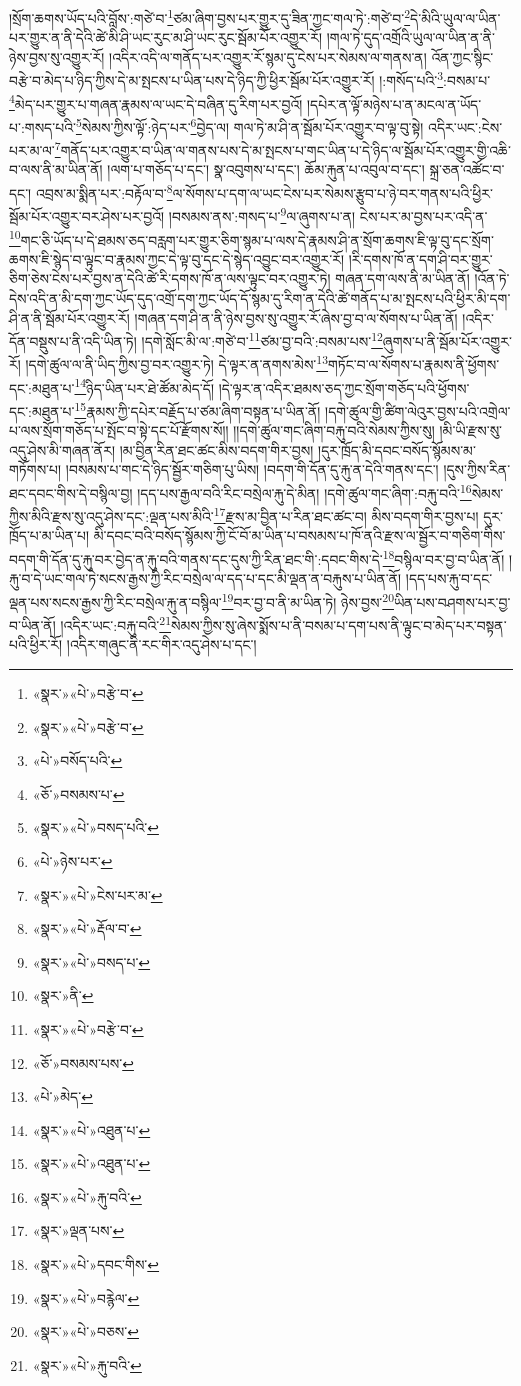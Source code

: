 །སྲོག་ཆགས་ཡོད་པའི་བློས་:གཙེ་བ་\footnote{«སྣར་»«པེ་»བརྩེ་བ་}ཙམ་ཞིག་བྱས་པར་གྱུར་དུ་ཟིན་ཀྱང་གལ་ཏེ་:གཙེ་བ་\footnote{«སྣར་»«པེ་»བརྩེ་བ་}དེ་མིའི་ཡུལ་ལ་ཡིན་པར་གྱུར་ན་ནི་དེའི་ཚེ་མི་ཤི་ཡང་རུང་མ་ཤི་ཡང་རུང་སྦོམ་པོར་འགྱུར་རོ། །གལ་ཏེ་དུད་འགྲོའི་ཡུལ་ལ་ཡིན་ན་ནི་ཉེས་བྱས་སུ་འགྱུར་རོ། །འདིར་འདི་ལ་གནོད་པར་འགྱུར་རོ་སྙམ་དུ་ངེས་པར་སེམས་ལ་གནས་ན། འོན་ཀྱང་སྙིང་བརྩེ་བ་མེད་པ་ཉིད་ཀྱིས་དེ་མ་སྤངས་པ་ཡིན་པས་དེ་ཉིད་ཀྱི་ཕྱིར་སྦོམ་པོར་འགྱུར་རོ། །:གསོད་པའི་\footnote{«པེ་»བསོད་པའི་}:བསམ་པ་\footnote{«ཅོ་»བསམས་པ་}མེད་པར་གྱུར་པ་གཞན་རྣམས་ལ་ཡང་དེ་བཞིན་དུ་རིག་པར་བྱའོ། །དཔེར་ན་ལྟོ་མཉེས་པ་ན་མངལ་ན་ཡོད་པ་:གསད་པའི་\footnote{«སྣར་»«པེ་»བསད་པའི་}སེམས་ཀྱིས་ལྟོ་:ཉེད་པར་\footnote{«པེ་»ཉེས་པར་}བྱེད་ལ། གལ་ཏེ་མ་ཤི་ན་སྦོམ་པོར་འགྱུར་བ་ལྟ་བུ་སྟེ། འདིར་ཡང་:ངེས་པར་མ་ལ་\footnote{«སྣར་»«པེ་»ངེས་པར་མ་}གནོད་པར་འགྱུར་བ་ཡིན་ལ་གནས་པས་དེ་མ་སྤངས་པ་གང་ཡིན་པ་དེ་ཉིད་ལ་སྦོམ་པོར་འགྱུར་གྱི་འཆི་བ་ལས་ནི་མ་ཡིན་ནོ། །ལག་པ་གཅོད་པ་དང་། སྣ་འབུགས་པ་དང་། ཆོམ་རྐུན་པ་འབུལ་བ་དང་། སྐྲ་ཅན་འཚོང་བ་དང་། འབྲས་མ་སྨིན་པར་:བརྟོལ་བ་\footnote{«སྣར་»«པེ་»རྡོལ་བ་}ལ་སོགས་པ་དག་ལ་ཡང་ངེས་པར་སེམས་རྩུབ་པ་ཉེ་བར་གནས་པའི་ཕྱིར་སྦོམ་པོར་འགྱུར་བར་ཤེས་པར་བྱའོ། །བསམས་ནས་:གསད་པ་\footnote{«སྣར་»«པེ་»བསད་པ་}ལ་ཞུགས་པ་ན། ངེས་པར་མ་བྱས་པར་འདི་ན་\footnote{«སྣར་»ནི་}གང་ཅི་ཡོད་པ་དེ་ཐམས་ཅད་བརླག་པར་གྱུར་ཅིག་སྙམ་པ་ལས་དེ་རྣམས་ཤི་ན་སྲོག་ཆགས་ཇི་ལྟ་བུ་དང་སྲོག་ཆགས་ཇི་སྙེད་བ་ལྟུང་བ་རྣམས་ཀྱང་དེ་ལྟ་བུ་དང་དེ་སྙེད་འབྱུང་བར་འགྱུར་རོ། །རི་དགས་ཁོ་ན་དག་ཤི་བར་གྱུར་ཅིག་ཅེས་ངེས་པར་བྱས་ན་དེའི་ཚེ་རི་དགས་ཁོ་ན་ལས་ལྟུང་བར་འགྱུར་ཏེ། གཞན་དག་ལས་ནི་མ་ཡིན་ནོ། །འོན་ཏེ་དེས་འདི་ན་མི་དག་ཀྱང་ཡོད་དུད་འགྲོ་དག་ཀྱང་ཡོད་དོ་སྙམ་དུ་རིག་ན་དེའི་ཚེ་གནོད་པ་མ་སྤངས་པའི་ཕྱིར་མི་དག་ཤི་ན་ནི་སྦོམ་པོར་འགྱུར་རོ། །གཞན་དག་ཤི་ན་ནི་ཉེས་བྱས་སུ་འགྱུར་རོ་ཞེས་བྱ་བ་ལ་སོགས་པ་ཡིན་ནོ། །འདིར་དོན་བསྡུས་པ་ནི་འདི་ཡིན་ཏེ། །དགེ་སློང་མི་ལ་:གཙེ་བ་\footnote{«སྣར་»«པེ་»བརྩེ་བ་}ཙམ་བྱ་བའི་:བསམ་པས་\footnote{«ཅོ་»བསམས་པས་}ཞུགས་པ་ནི་སྦོམ་པོར་འགྱུར་རོ། །དགེ་ཚུལ་ལ་ནི་ཡིད་ཀྱིས་བྱ་བར་འགྱུར་ཏེ། དེ་ལྟར་ན་ནགས་མེས་\footnote{«པེ་»མེད་}གཏོང་བ་ལ་སོགས་པ་རྣམས་ནི་ཕྱོགས་དང་:མཐུན་པ་\footnote{«སྣར་»«པེ་»འཐུན་པ་}ཉིད་ཡིན་པར་ཐེ་ཚོམ་མེད་དོ། །དེ་ལྟར་ན་འདིར་ཐམས་ཅད་ཀྱང་སྲོག་གཅོད་པའི་ཕྱོགས་དང་:མཐུན་པ་\footnote{«སྣར་»«པེ་»འཐུན་པ་}རྣམས་ཀྱི་དཔེར་བརྗོད་པ་ཙམ་ཞིག་བསྟན་པ་ཡིན་ནོ། །དགེ་ཚུལ་གྱི་ཚིག་ལེའུར་བྱས་པའི་འགྲེལ་པ་ལས་སྲོག་གཅོད་པ་སྤོང་བ་སྟེ་དང་པོ་རྫོགས་སོ།། །།དགེ་ཚུལ་གང་ཞིག་བརྐུ་བའི་སེམས་ཀྱིས་སུ། །མི་ཡི་རྫས་སུ་འདུ་ཤེས་མི་གཞན་ནོར། །མ་བྱིན་རིན་ཐང་ཚང་མིས་བདག་གིར་བྱས། །དུར་ཁྲོད་མི་དབང་བསོད་སྙོམས་མ་གཏོགས་པ། །བསམས་པ་གང་དེ་ཉིད་སྦྱོར་གཅིག་པུ་ཡིས། །བདག་གི་དོན་དུ་རྐུ་ན་དེའི་གནས་དང་། །དུས་ཀྱིས་རིན་ཐང་དབང་གིས་དེ་བསྙིལ་བྱ། །དད་པས་རྒྱལ་བའི་རིང་བསྲེལ་རྐུ་དེ་མིན། །དགེ་ཚུལ་གང་ཞིག་:བརྐུ་བའི་\footnote{«སྣར་»«པེ་»རྐུ་བའི་}སེམས་ཀྱིས་མིའི་རྫས་སུ་འདུ་ཤེས་དང་:ལྡན་པས་མིའི་\footnote{«སྣར་»ལྡན་པས་}རྫས་མ་བྱིན་པ་རིན་ཐང་ཚང་བ། མིས་བདག་གིར་བྱས་པ། དུར་ཁྲོད་པ་མ་ཡིན་པ། མི་དབང་བའི་བསོད་སྙོམས་ཀྱི་ངོ་བོ་མ་ཡིན་པ་བསམས་པ་ཁོ་ནའི་རྫས་ལ་སྦྱོར་བ་གཅིག་གིས་བདག་གི་དོན་དུ་རྐུ་བར་བྱེད་ན་རྐུ་བའི་གནས་དང་དུས་ཀྱི་རིན་ཐང་གི་:དབང་གིས་དེ་\footnote{«སྣར་»«པེ་»དབང་གིས་}བསྙིལ་བར་བྱ་བ་ཡིན་ནོ། །རྐུ་བ་དེ་ཡང་གལ་ཏེ་སངས་རྒྱས་ཀྱི་རིང་བསྲེལ་ལ་དད་པ་དང་མི་ལྡན་ན་བརྐུས་པ་ཡིན་ནོ། །དད་པས་རྐུ་བ་དང་ལྡན་པས་སངས་རྒྱས་ཀྱི་རིང་བསྲེལ་རྐུ་ན་བསྙིལ་\footnote{«སྣར་»«པེ་»བརྙེལ་}བར་བྱ་བ་ནི་མ་ཡིན་ཏེ། ཉེས་བྱས་\footnote{«སྣར་»«པེ་»བཅས་}ཡིན་པས་བཤགས་པར་བྱ་བ་ཡིན་ནོ། །འདིར་ཡང་:བརྐུ་བའི་\footnote{«སྣར་»«པེ་»རྐུ་བའི་}སེམས་ཀྱིས་སུ་ཞེས་སྨོས་པ་ནི་བསམ་པ་དག་པས་ནི་ལྟུང་བ་མེད་པར་བསྟན་པའི་ཕྱིར་རོ། །འདིར་གཞུང་ནི་རང་གིར་འདུ་ཤེས་པ་དང་། 